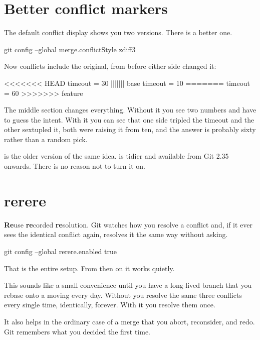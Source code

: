 \documentclass[11pt]{article}
\begin{document}
\section{Better conflict markers}

The default conflict display shows you two versions. There is a better one.

\begin{shell}
git config --global merge.conflictStyle zdiff3
\end{shell}

Now conflicts include the original, from before either side changed it:

\begin{terminal}
<<<<<<< HEAD
timeout = 30
||||||| base
timeout = 10
=======
timeout = 60
>>>>>>> feature
\end{terminal}

The middle section changes everything. Without it you see two numbers and have to
guess the intent. With it you can see that one side tripled the timeout and the
other sextupled it, both were raising it from ten, and the answer is probably sixty
rather than a random pick.

 is the older version of the same idea.  is tidier and
available from Git 2.35 onwards. There is no reason not to turn it on.

\section{rerere}

\textbf{Re}use \textbf{re}corded \textbf{re}solution. Git watches how you resolve a
conflict and, if it ever sees the identical conflict again, resolves it the same way
without asking.

\begin{shell}
git config --global rerere.enabled true
\end{shell}

That is the entire setup. From then on it works quietly.

\begin{why}
This sounds like a small convenience until you have a long-lived branch that you
rebase onto a moving  every day. Without  you resolve the same
three conflicts every single time, identically, forever. With it you resolve them
once.

It also helps in the ordinary case of a merge that you abort, reconsider, and redo.
Git remembers what you decided the first time.
\end{why}
\end{document}
